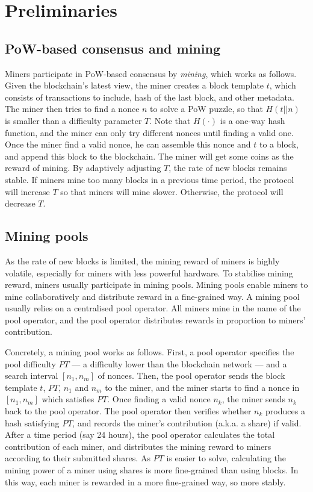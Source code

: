 \section{Preliminaries}
\label{sec:preliminaries}

\subsection{PoW-based consensus and mining}
Miners participate in PoW-based consensus by \emph{mining}, which works as follows.
Given the blockchain's latest view, the miner creates a block template $t$, which consists of transactions to include, hash of the last block, and other metadata.
The miner then tries to find a nonce $n$ to solve a PoW puzzle, so that $H(t || n)$ is smaller than a difficulty parameter $T$.
Note that $H(\cdot)$ is a one-way hash function, and the miner can only try different nonces until finding a valid one.
Once the miner find a valid nonce, he can assemble this nonce and $t$ to a block, and append this block to the blockchain.
The miner will get some coins as the reward of mining.
By adaptively adjusting $T$, the rate of new blocks remains stable.
If miners mine too many blocks in a previous time period, the protocol will increase $T$ so that miners will mine slower.
Otherwise, the protocol will decrease $T$.

\subsection{Mining pools}
As the rate of new blocks is limited, the mining reward of miners is highly volatile, especially for miners with less powerful hardware.
To stabilise mining reward, miners usually participate in mining pools.
Mining pools enable miners to mine collaboratively and distribute reward in a fine-grained way.
A mining pool usually relies on a centralised pool operator.
All miners mine in the name of the pool operator, and the pool operator distributes rewards in proportion to miners' contribution.

Concretely, a mining pool works as follows.
First, a pool operator specifies the pool difficulty $PT$ --- a difficulty lower than the blockchain network --- and a search interval $[n_1, n_m]$ of nonces.
Then, the pool operator sends the block template $t$, $PT$, $n_1$ and $n_m$ to the miner, and the miner starts to find a nonce in $[n_1, n_m]$ which satisfies $PT$.
Once finding a valid nonce $n_k$, the miner sends $n_k$ back to the pool operator.
The pool operator then verifies whether $n_k$ produces a hash satisfying $PT$, and records the miner's contribution (a.k.a. a share) if valid.
After a time period (say 24 hours), the pool operator calculates the total contribution of each miner, and distributes the mining reward to miners according to their submitted shares.
As $PT$ is easier to solve, calculating the mining power of a miner using shares is more fine-grained than using blocks.
In this way, each miner is rewarded in a more fine-grained way, so more stably.


